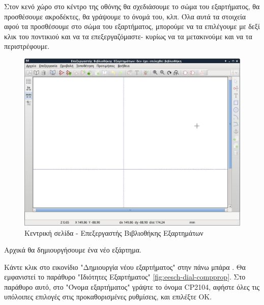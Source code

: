 \documentclass[a4paper]{article}
\begin{document}
Στον κενό χώρο στο κέντρο της οθόνης θα σχεδιάσουμε το σώμα του εξαρτήματος, θα προσθέσουμε ακροδέκτες, θα γράψουμε το όνομά του, κλπ. Όλα αυτά τα στοιχεία αφού τα προσθέσουμε στο σώμα του εξαρτήματος, μπορούμε να τα επιλέγουμε με δεξί κλικ του ποντικιού και να τα επεξεργαζόμαστε- κυρίως να τα μετακινούμε και να τα περιστρέφουμε.

\begin{figure}
  \begin{center}
    \includegraphics[width=.9\textwidth]{img/libed-main-window.png}
    \caption{Kεντρική σελίδα - Επεξεργαστής Βιβλιοθήκης Εξαρτημάτων}
    \label{fig:libed-main-window}
  \end{center}
\end{figure}

Αρχικά θα δημιουργήσουμε ένα νέο εξάρτημα.

Κάντε κλικ στο εικονίδιο "Δημιουργία νέου εξαρτήματος" στην πάνω μπάρα %
. Θα εμφανιστεί το παράθυρο "Ιδιότητες Εξαρτήματος" \ref{fig:eesch-dial-compprop}. Στο παράθυρο αυτό, στο "Όνομα εξαρτήματος" γράψτε το όνομα \textenglish{CP2104}, αφήστε όλες τις υπόλοιπες επιλογές στις προκαθορισμένες ρυθμίσεις, και επιλέξτε ΟΚ.
\end{document}
